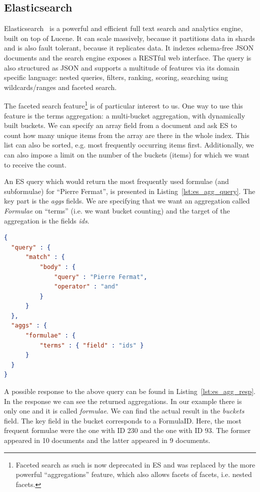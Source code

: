 \documentclass[a4paper,oneside]{article}
\begin{document}
\subsection{Elasticsearch}\label{subsec:prelim:els}
Elasticsearch~\cite{esl:online} is a powerful and efficient full text search
and analytics engine, built on top of Lucene. It can scale massively, because
it partitions data in shards and is also fault tolerant, because it replicates
data.  It indexes schema-free JSON documents and the search engine exposes a
RESTful web interface.  The query is also structured as JSON and supports a
multitude of features via its domain specific language:  nested queries,
filters, ranking, scoring, searching using wildcards/ranges and faceted search.

The faceted search feature\footnote{Faceted search as such is now deprecated in
ES and was replaced by the more powerful ``aggregations'' feature, which
also allows facets of facets, i.e. nested facets.} is of
particular interest to us. 
One way to use this feature is the terms aggregation: a multi-bucket
aggregation, with dynamically built buckets.  We can specify an array field
from a document and ask ES to count how many unique items from the array are
there in the whole index.  This list can also be sorted, e.g. most frequently
occurring items first.  Additionally, we can also impose a limit on the number
of the buckets (items) for which we want to receive the count.

An ES query which would return the most frequently used formulae (and
subformulae) for ``Pierre Fermat'', is presented in
Listing~\ref{lst:es_agg_query}. The key part is the \emph{aggs} fields. We are
specifying that we want an aggregation called \textit{Formulae} on ``terms''
(i.e. we want bucket counting) and the target of the aggregation is the fields
\emph{ids}.

\begin{lstlisting}[float,
    language=json,
    firstnumber=1,
    caption=Elastic Search Term Aggregation Query,
    captionpos=b, label=lst:es_agg_query]
{
  "query" : {
      "match" : {
          "body" : {
              "query" : "Pierre Fermat",
              "operator" : "and"
          }
      }
  },
  "aggs" : {
      "formulae" : {
          "terms" : { "field" : "ids" }
      }
  }
}
\end{lstlisting}
\FloatBarrier

A possible response to the above query can be found in
Listing~\ref{lst:es_agg_resp}. In the response we can see the returned
aggregations. In our example there is only one and it is called
\emph{formulae}. We can find the actual result in the \emph{buckets} field. The
\textsf{key} field in the bucket corresponds to a \textsf{FormulaID}.
Here, the most frequent formulae were the one with ID 230 and the one with ID
93. The former appeared in 10 documents and the latter appeared in 9 documents.
\end{document}
